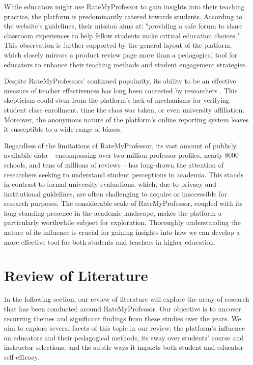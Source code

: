 \documentclass[twocolumn, doc,12pt]{apa7}
\begin{document}
While educators might use RateMyProfessor to gain insights into their teaching practice, the platform is predominantly catered towards students. According to the website's guidelines, their mission aims at: "providing a safe forum to share classroom experiences to help fellow students make critical education choices." This observation is further supported by the general layout of the platform, which closely mirrors a product review page more than a pedagogical tool for educators to enhance their teaching methods and student engagement strategies.

Despite RateMyProfessors' continued popularity, its ability to be an effective measure of teacher effectiveness has long been contested by researchers \textcite{rosen_correlations_2018}. This skepticism could stem from the platform's lack of mechanisms for verifying student class enrollment, time the class was taken, or even university affiliation. Moreover, the anonymous nature of the platform's online reporting system leaves it susceptible to a wide range of biases.

Regardless of the limitations of RateMyProfessor, its vast amount of publicly availabile data -- encompassing over two million professor profiles, nearly 8000 schools, and tens of millions of reviews -- has long-drawn the attention of researchers seeking to understand student perceptions in academia. This stands in contrast to formal university evaluations, which, due to privacy and institutional guidelines, are often challenging to acquire or inaccessible for research purposes. The considerable scale of RateMyProfessor, coupled with its long-standing presence in the academic landscape, makes the platform a particularly worthwhile subject for exploration. Thoroughly understanding the nature of its influence is crucial for gaining insights into how we can develop a more effective tool for both students and teachers in higher education.

\section{Review of Literature}
In the following section, our review of literature will explore the array of research that has been conducted around RateMyProfessor. Our objective is to uncover recurring themes and significant findings from these studies over the years. We aim to explore several facets of this topic in our review: the platform’s influence on educators and their pedagogical methods, its sway over students' course and instructor selections, and the subtle ways it impacts both student and educator self-efficacy.
\end{document}
